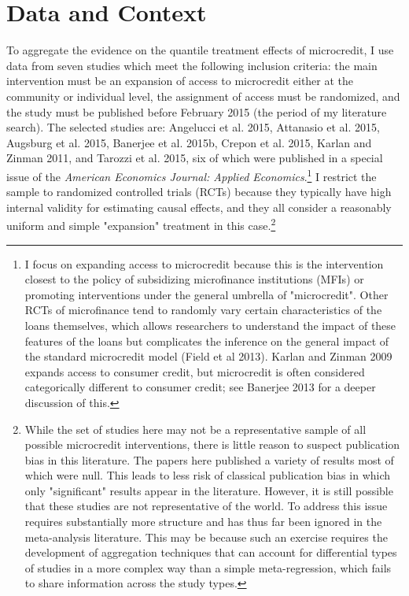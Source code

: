 \documentclass[AER]{AEA}
\begin{document}
\section{Data and Context}


To aggregate the evidence on the quantile treatment effects of microcredit, I use data from seven studies which meet the following inclusion criteria: the main intervention must be an expansion of access to microcredit either at the community or individual level, the assignment of access must be randomized, and the study must be published before February 2015 (the period of my literature search). The selected studies are: Angelucci et al. 2015, Attanasio et al. 2015, Augsburg et al. 2015, Banerjee et al. 2015b, Crepon et al. 2015, Karlan and Zinman 2011, and Tarozzi et al. 2015, six of which were published in a special issue of the \emph{American Economics Journal: Applied Economics}.\footnote{I focus on expanding access to microcredit because this is the intervention closest to the policy of subsidizing microfinance institutions (MFIs) or promoting interventions under the general umbrella of "microcredit". Other RCTs of microfinance tend to randomly vary certain characteristics of the loans themselves, which allows researchers to understand the impact of these features of the loans but complicates the inference on the general impact of the standard microcredit model (Field et al 2013). Karlan and Zinman 2009 expands access to consumer credit, but microcredit is often considered categorically different to consumer credit; see Banerjee 2013 for a deeper discussion of this.} I restrict the sample to randomized controlled trials (RCTs) because they typically have high internal validity for estimating causal effects, and they all consider a reasonably uniform and simple "expansion" treatment in this case.\footnote{While the set of studies here may not be a representative sample of all possible microcredit interventions, there is little reason to suspect publication bias in this literature. The papers here published a variety of results most of which were null. This leads to less risk of classical publication bias in which only "significant" results appear in the literature. However, it is still possible that these studies are not representative of the world. To address this issue requires substantially more structure and has thus far been ignored in the meta-analysis literature. This may be because such an exercise requires the development of aggregation techniques that can account for differential types of studies in a more complex way than a simple meta-regression, which fails to share information across the study types.}
\end{document}
